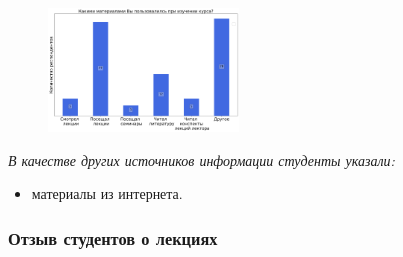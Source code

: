 		\begin{figure}[H]
			\centering
			\includegraphics[width = 0.45\textwidth]{images/1 course/БЖД/materials.png}
		\end{figure}

		\textit{В качестве других источников информации студенты указали:} 
		\begin{itemize}
			\item материалы из интернета.
		\end{itemize}

	\subsubsection{Отзыв студентов о лекциях}

